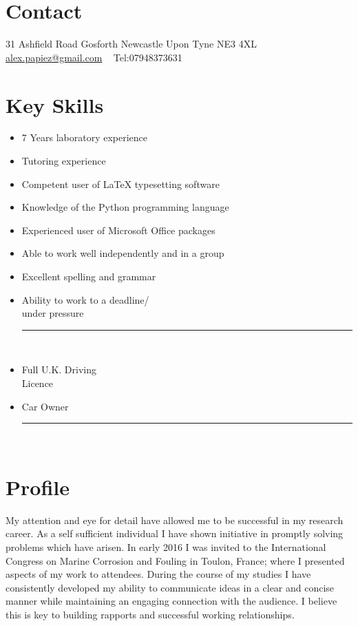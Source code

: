 \documentclass[]{friggeri-cv}
\begin{document}
       {%
       	}
       {}


\begin{aside}
 \vspace{-0.5cm}
  \section{Contact}
    31 Ashfield Road
    Gosforth
    Newcastle Upon Tyne
    NE3 4XL
    ~
    \href{mailto:alex.papiez@gmail.com}{alex.papiez@gmail.com}
    ~
    Tel:07948373631
    ~
  \section{Key Skills}
   \begin{itemize}
   \item 7 Years laboratory experience
   \item Tutoring experience
   \item Competent user of LaTeX typesetting software
   \item Knowledge of the Python programming language
   \item Experienced user of Microsoft Office packages
   \item Able to work well independently and in a group
   \item Excellent spelling and grammar
   \item Ability to work to a deadline/ \\ under pressure
   \rule[0.125cm]{0.6\textwidth}{0.4pt}\\
   \item Full U.K. Driving\\ Licence
   \item Car Owner 
   \rule[0.125cm]{0.6\textwidth}{0.4pt}
   \end{itemize}
   ~
   ~
\end{aside}
\vspace{-0.6cm}
\section{Profile}
My attention and eye for detail have allowed me to be successful in my research career. As a self sufficient individual I have shown initiative in promptly solving problems which have arisen. In early 2016 I was invited to the International Congress on Marine Corrosion and Fouling in Toulon, France; where I presented aspects of my work to attendees. During the course of my studies I have consistently developed my ability to communicate ideas in a clear and concise manner while maintaining an engaging connection with the audience. I believe this is key to building rapports and successful working relationships. 
\end{document}

